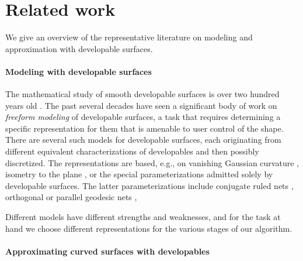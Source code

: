

\section{Related work} 
\label{sec:related-work}


We give an overview of the representative literature on modeling and approximation with developable surfaces.

\paragraph{Modeling with developable surfaces}
The mathematical study of smooth developable surfaces is over two hundred years old \cite{DevHistory}. The past several decades have seen a significant body of work on \emph{freeform modeling} of developable surfaces, a task that requires determining a specific representation for them that is amenable to user control of the shape.
There are several such models for developable surfaces, each originating from different equivalent characterizations of developables and then possibly discretized. 
The representations are based, e.g., on vanishing Gaussian curvature \cite{wang2004achieving}, isometry to the plane \cite{grin_shells}, or the special parameterizations admitted solely by developable surfaces. The latter parameterizations include conjugate ruled nets \cite{conical, Bo:GeodesicControlled:2007, Solomon:Flexible:2012, Tang:InteractiveDevelopables:2016, stein_dev}, orthogonal or parallel geodesic nets \cite{Rabinovich:DogNets:2018,Wang2019geodesic}, 
    
%
Different models have different strengths and weaknesses, and for the task at hand we choose different representations for the various stages of our algorithm. 


\paragraph{Approximating curved surfaces with developables}

